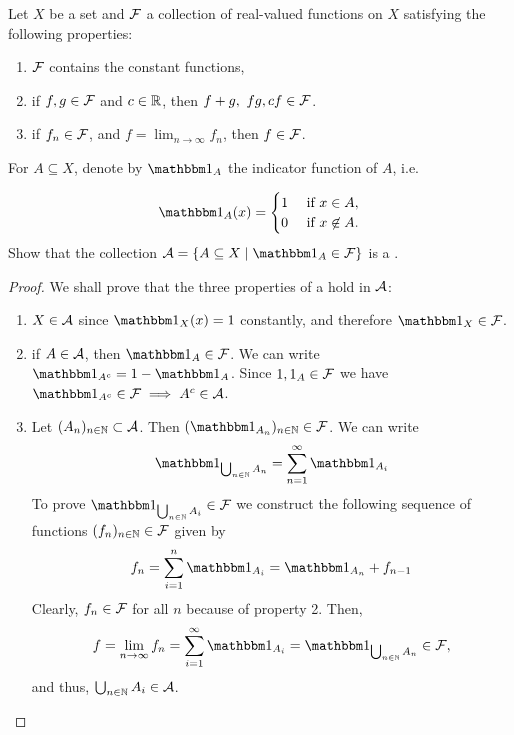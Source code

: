 \begin{ex}
	Let $X$ be a set and $\mathcal{F}$ a collection of real-valued functions on $X$ satisfying the following properties:
	\begin{enumerate}
		\item $\mathcal{F}$ contains the constant functions,
		\item if $f, g \in \mathcal{F}$ and $c \in \mathbb{R}$, then $f + g,\ fg, cf \in \mathcal{F}$.
		\item if $f_n \in \mathcal{F}$, and $f = \lim_{n \to \infty} f_n$, then $f \in \mathcal{F}$.
	\end{enumerate}

	For $A \subseteq X$, denote by $\ind_{A}$ the indicator function of $A$, i.e.
	
	\begin{align*}
		\ind_A(x) = \begin{cases}
		1 \tif x \in A,\\
		0 \tif x \not\in A.
		\end{cases}
	\end{align*}
	Show that the collection $\sa = \{ A \subseteq X \mid \ind_A \in \calF\}$ is a \siga.
\end{ex}

\begin{proof}
	We shall prove that the three properties of a \siga hold in $\mathcal{A}$:
	\begin{enumerate}
		\item $X \in \mathcal{A}$ since $\ind_X(x) = 1$ constantly, and therefore $\ind_X \in \calF$.
		\item if $A \in \mathcal{A}$, then $\ind_A \in \calF$. We can write $\ind_{A^\complement} = 1 - \ind_A$. Since $1, 1_A \in \mathcal{F}$ we have $\ind_{A^\complement} \in \calF \implies A^\complement \in \sa$.
		\item Let $(A_n)_{n\in \mathbb{N}} \subset \mathcal{A}$. Then $(\ind_{A_n})_{n\in\N} \in \calF$. We can write
		\begin{align*}
			\ind_{\bigcup_{n\in\N} A_n} = \sum_{n=1}^{\infty} \ind_{A_i}
		\end{align*}
		To prove $\ind_{\bigcup_{n\in\N} A_i} \in \calF$ we construct the following sequence of functions $(f_n)_{n\in\mathbb{N}} \in \mathcal{F}$ given by
		\begin{align*}
			f_n = \sum_{i=1}^{n} \ind_{A_i} = \ind_{A_n} + f_{n-1}
		\end{align*}
		Clearly, $f_n \in \mathcal{F}$ for all $n$ because of property 2. Then,
		\begin{align*}
			f = \lim_{n \to \infty} f_n = \sum_{i = 1}^\infty \ind_{A_i} = \ind_{\bigcup_{n\in\N} A_n} \in \calF,
		\end{align*}
		and thus, $\bigcup_{n\in\mathbb{N}} A_i \in \mathcal{A}$.
	\end{enumerate}
\end{proof}

